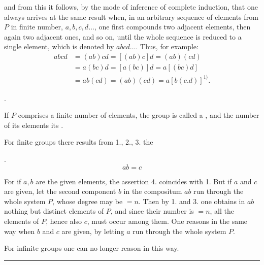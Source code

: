 

and from this it follows, by the mode of inference of complete induction, that one always arrives at the same result when, in an arbitrary sequence of elements from $P$ in finite number, $a, b, c, d \ldots$, one first compounds two adjacent elements, then again two adjacent ones, and so on, until the whole sequence is reduced to a single element, which is denoted by $abcd \ldots$. Thus, for example:
\[
\begin{aligned}
abcd &= (ab)cd = [(ab)c]d = (ab)(cd)\\
&= a(bc)d = [a(bc)]d = a[(bc)d]\\
&= ab(cd) = (ab)(cd) = a[b(c.d)]^{1)}. %
\end{aligned}
\]

.\  %

If $P$ comprises a finite number of elements, the group is called a , and the number of its elements its .

For finite groups there results from 1., 2., 3. the 

.\ 
\[
ab = c
\]

For if $a, b$ are the given elements, the assertion 4. coincides with 1. But if $a$ and $c$ are given, let the second component $b$ in the compositum $ab$ run through the whole system $P$, whose degree may be $= n$. Then by 1. and 3. one obtains in $ab$ nothing but distinct elements of $P$, and since their number is $= n$, all the elements of $P$, hence also $c$, must occur among them. One reasons in the same way when $b$ and $c$ are given, by letting $a$ run through the whole system $P$.

For infinite groups one can no longer reason in this way. 

\noindent\rule{3cm}{0.4pt}

